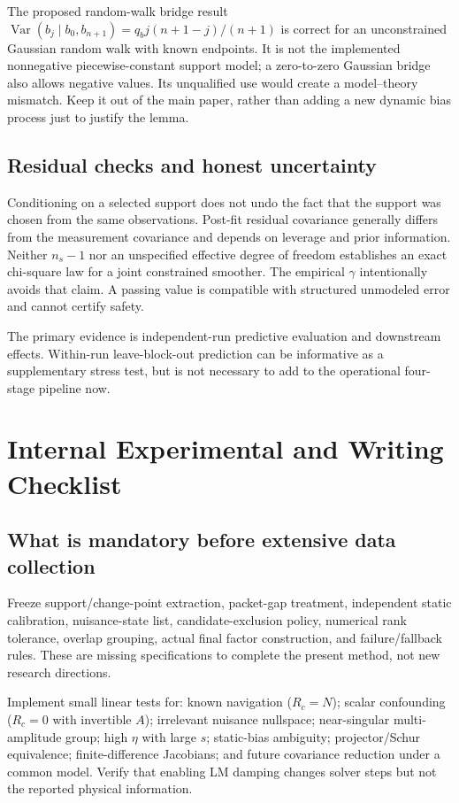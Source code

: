 \documentclass[conference]{IEEEtran}
\newcommand{\Var}{\operatorname{Var}}
\begin{document}
The proposed random-walk bridge result
$\Var(b_j\mid b_0,b_{n+1})=q_bj(n+1-j)/(n+1)$
is correct for an unconstrained Gaussian random walk with known endpoints. It is not the implemented nonnegative piecewise-constant support model; a zero-to-zero Gaussian bridge also allows negative values. Its unqualified use would create a model--theory mismatch. Keep it out of the main paper, rather than adding a new dynamic bias process just to justify the lemma.

\subsection{Residual checks and honest uncertainty}
Conditioning on a selected support does not undo the fact that the support was chosen from the same observations. Post-fit residual covariance generally differs from the measurement covariance and depends on leverage and prior information. Neither $n_s-1$ nor an unspecified effective degree of freedom establishes an exact chi-square law for a joint constrained smoother. The empirical $\gamma$ intentionally avoids that claim. A passing value is compatible with structured unmodeled error and cannot certify safety.

The primary evidence is independent-run predictive evaluation and downstream effects. Within-run leave-block-out prediction can be informative as a supplementary stress test, but is not necessary to add to the operational four-stage pipeline now.

\section{Internal Experimental and Writing Checklist}
\subsection{What is mandatory before extensive data collection}
Freeze support/change-point extraction, packet-gap treatment, independent static calibration, nuisance-state list, candidate-exclusion policy, numerical rank tolerance, overlap grouping, actual final factor construction, and failure/fallback rules. These are missing specifications to complete the present method, not new research directions.

Implement small linear tests for: known navigation ($R_c=N$); scalar confounding ($R_c=0$ with invertible $A$); irrelevant nuisance nullspace; near-singular multi-amplitude group; high $\eta$ with large $s$; static-bias ambiguity; projector/Schur equivalence; finite-difference Jacobians; and future covariance reduction under a common model. Verify that enabling LM damping changes solver steps but not the reported physical information.
\end{document}
